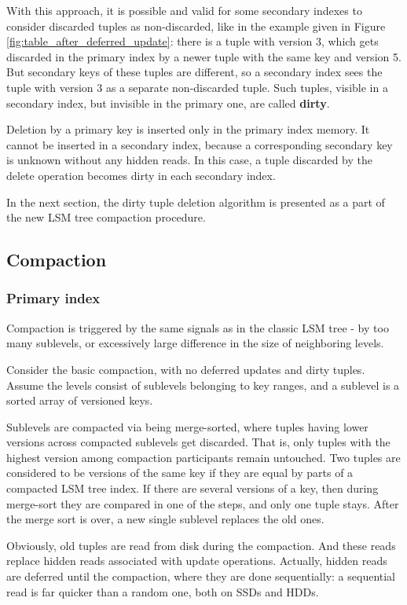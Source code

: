\documentclass{vldb}
\begin{document}
With this approach, it is possible and valid for some secondary indexes to consider
discarded tuples as non-discarded, like in the example given in Figure
\ref{fig:table_after_deferred_update}: there is a tuple with
version 3, which gets discarded in the primary index by a newer tuple with the same
key and version 5. But secondary keys of these tuples are different, so a
secondary index sees the tuple with version 3 as a separate non-discarded tuple.
Such tuples, visible in a secondary index, but invisible in the primary one, are
called \textbf{dirty}.

Deletion by a primary key is inserted only in the primary index memory. It cannot
be inserted in a secondary index, because a corresponding secondary key is
unknown without any hidden reads. In this case, a tuple discarded by the delete
operation becomes dirty in each secondary index.

In the next section, the dirty tuple deletion algorithm is presented as a part of
the new LSM tree compaction procedure.

\subsection{Compaction}
\subsubsection{Primary index}

Compaction is triggered by the same signals as in the classic LSM tree - by
too many sublevels, or excessively large difference in the size of neighboring levels.

Consider the basic compaction, with no deferred updates and dirty tuples.
Assume the levels consist of sublevels belonging to key ranges, and a sublevel
is a sorted array of versioned keys.

Sublevels are compacted via being merge-sorted, where tuples having lower
versions across compacted sublevels get discarded. That is, only tuples with the
highest version among compaction participants remain untouched. Two tuples are considered
to be versions of the same key if they are equal by parts of a compacted LSM tree
index. If there are several versions of a key, then during merge-sort they are compared
in one of the steps, and only one tuple stays. After the merge sort is over,
a new single sublevel replaces the old ones.

Obviously, old tuples are read from disk during the compaction. And these reads
replace hidden reads associated with update operations. Actually, hidden reads are
deferred until the compaction, where they are done sequentially: a sequential read
is far quicker than a random one, both on SSDs and HDDs.
\end{document}
